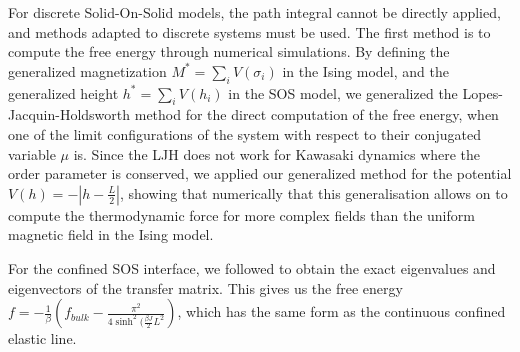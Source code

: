 For discrete  Solid-On-Solid models, the path integral cannot be directly applied, and methods adapted to discrete systems must be used. The first method is to compute the free energy through numerical simulations. By defining the generalized magnetization $M^\ast = \sum_i V(\sigma_i)$ in the Ising model, and the generalized height $h^\ast = \sum_i V(h_i)$ in the SOS model, we generalized the Lopes-Jacquin-Holdsworth method \cite{lopes_cardozo_critical_2014} for the direct computation of the free energy, when one of the limit configurations of the system with respect to their conjugated variable $\mu$ is. Since the LJH does not work for Kawasaki dynamics where the order parameter is conserved, we applied our generalized method for the potential $V(h) = - | h - \frac{L}{2}|$, showing that numerically that this generalisation allows on to  compute the thermodynamic force for more complex fields than the uniform magnetic field in the Ising model.

For the confined SOS interface, we followed \cite{svrakic_finite-size_1988} to obtain the exact eigenvalues and eigenvectors of the transfer matrix. This gives us the free energy $f = -\frac{1}{\beta} \left( f_{bulk} - \frac{\pi^2}{4 \sinh^2(\frac{\beta J}{2} L^2 } \right)$, which has the same form as the continuous confined elastic line. 
